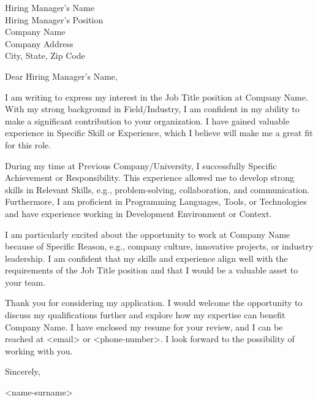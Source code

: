 \documentclass[a4paper,12pt]{article} %
\begin{document}
\vspace{12pt}
\vspace{12pt}

\begin{center}
    Hiring Manager's Name\\
    Hiring Manager's Position\\
    Company Name\\
    Company Address\\
    City, State, Zip Code
\end{center}

\vspace{12pt}
\vspace{12pt}

\begin{center}
    Dear Hiring Manager's Name,
\end{center}

\vspace{12pt}
\vspace{12pt}

I am writing to express my interest in the Job Title position at Company Name. With my strong background in Field/Industry, I am confident in my ability to make a significant contribution to your organization. I have gained valuable experience in Specific Skill or Experience, which I believe will make me a great fit for this role.

During my time at Previous Company/University, I successfully Specific Achievement or Responsibility. This experience allowed me to develop strong skills in Relevant Skills, e.g., problem-solving, collaboration, and communication. Furthermore, I am proficient in Programming Languages, Tools, or Technologies and have experience working in Development Environment or Context.

I am particularly excited about the opportunity to work at Company Name because of Specific Reason, e.g., company culture, innovative projects, or industry leadership. I am confident that my skills and experience align well with the requirements of the Job Title position and that I would be a valuable asset to your team.

Thank you for considering my application. I would welcome the opportunity to discuss my qualifications further and explore how my expertise can benefit Company Name. I have enclosed my resume for your review, and I can be reached at <email> or <phone-number>. I look forward to the possibility of working with you.

\vspace{12pt}

Sincerely,

<name-surname>
\end{document}
